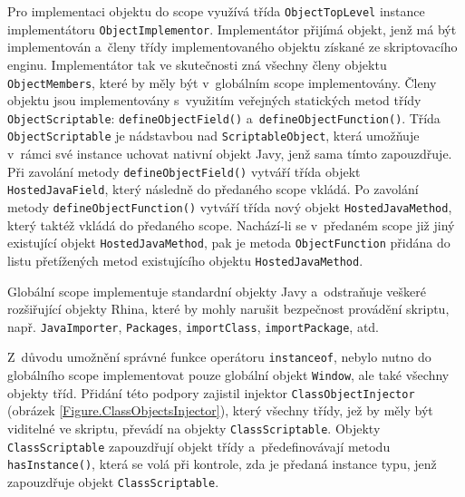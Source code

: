 Pro implementaci objektu do scope  využívá třída \texttt{ObjectTopLevel} instance implementátoru \texttt{ObjectImplementor}. Implementátor přijímá objekt, jenž má být implementován a~členy třídy implementovaného objektu získané ze skriptovacího enginu. Implementátor tak ve skutečnosti zná všechny členy objektu \texttt{ObjectMembers}, které by měly být v~globálním scope  implementovány. Členy objektu jsou implementovány s~využitím veřejných statických metod třídy \texttt{ObjectScriptable}: \texttt{defineObjectField()} a~\texttt{defineObjectFunction()}. Třída \texttt{ObjectScriptable} je nádstavbou nad \texttt{ScriptableObject}, která umožňuje v~rámci své instance uchovat nativní objekt Javy, jenž sama tímto zapouzdřuje. Při zavolání metody \texttt{defineObjectField()} vytváří třída objekt \texttt{HostedJavaField}, který následně do předaného scope  vkládá. Po zavolání metody \texttt{defineObjectFunction()} vytváří třída nový objekt \texttt{HostedJavaMethod}, který taktéž vkládá do předaného scope. Nachází-li se v~předaném scope  již jiný existující objekt \texttt{HostedJavaMethod}, pak je metoda \texttt{ObjectFunction} přidána do listu přetížených metod existujícího objektu \texttt{HostedJavaMethod}.

Globální scope implementuje standardní objekty Javy a~odstraňuje veškeré rozšiřující objekty Rhina, které by mohly narušit bezpečnost provádění skriptu, např. \texttt{JavaImporter}, \texttt{Packages}, \texttt{importClass}, \texttt{importPackage}, atd.

Z~důvodu umožnění správné funkce operátoru \texttt{instanceof}, nebylo nutno do globálního scope  implementovat pouze globální objekt \texttt{Window}, ale také všechny objekty tříd. Přidání této podpory zajistil injektor \texttt{ClassObjectInjector} (obrázek \ref{Figure.ClassObjectsInjector}), který všechny třídy, jež by měly být viditelné ve skriptu, převádí na objekty \texttt{ClassScriptable}. Objekty \texttt{ClassScriptable} zapouzdřují objekt třídy a~předefinovávají metodu \texttt{hasInstance()}, která se volá při kontrole, zda je předaná instance typu, jenž zapouzdřuje objekt \texttt{ClassScriptable}.

